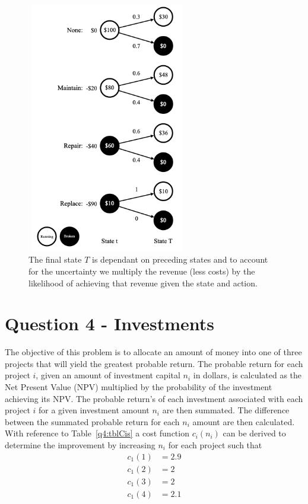 \documentclass[a4paper,11pt]{article}
\begin{document}
\begin{figure}[h]
\includegraphics[width=7cm, height=11cm]{q3States.png}
\centering
\caption{The final state $T$ is dependant on preceding states and to account for the uncertainty we multiply the revenue (less costs) by the likelihood of achieving that revenue given the state and action.}
\label{q3:Fig}
\end{figure}



\newpage
\section{Question 4 - Investments}
The objective of this problem is to allocate an amount of money into one of three projects that will yield the greatest probable return. The probable return for each project $i$, given an amount of investment capital $n_i$ in dollars, is calculated as the Net Present Value (NPV) multiplied by the probability of the investment achieving its NPV. The probable return's of each investment associated with each project $i$ for a given investment amount $n_i$ are then summated. The difference between the summated probable return for each $n_i$ amount are then calculated. With reference to Table~\ref{q4:tblCis} a cost function $c_i(n_i)$ can be derived to determine the improvement by increasing $n_i$ for each project such that
\begin{align}
	c_1(1) &= 2.9 \\
	c_1(2) &= 2 \\
	c_1(3) &= 2 \\
	c_1(4) &= 2.1
\end{align}
\end{document}
